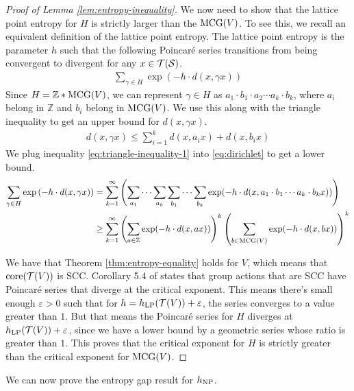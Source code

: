 \documentclass[12pt, reqno]{amsart}
\begin{document}
\begin{proof}[Proof of Lemma \ref{lem:entropy-inequality}]
  We now need to show that the lattice point entropy for $H$ is strictly larger than the $\mathrm{MCG}(V)$.
  To see this, we recall an equivalent definition of the lattice point entropy.
  The lattice point entropy is the parameter $h$ such that the following Poincaré series transitions from being convergent to divergent for any $x \in \mathcal{T}(\mathcal{S})$.
  \begin{align}
    \label{eq:dirichlet}
    \sum_{\gamma \in H} \exp\left( -h \cdot d(x, \gamma x) \right)
  \end{align}
  Since $H = \mathbb{Z} * \mathrm{MCG}(V)$, we can represent $\gamma \in H$ as $a_1 \cdot b_1 \cdot a_2 \cdots a_k \cdot b_k$, where $a_i$ belong in $\mathbb{Z}$ and $b_i$ belong in $\mathrm{MCG}(V)$.
  We use this along with the triangle inequality to get an upper bound for $d(x, \gamma x)$.
  \begin{align}
    \label{eq:triangle-inequality-1}
    d(x, \gamma x) \leq \sum_{i=1}^k d(x, a_i x) + d(x, b_i x)
  \end{align}
  We plug inequality \eqref{eq:triangle-inequality-1} into \eqref{eq:dirichlet} to get a lower bound.
  \begin{align}
    \label{eq:dirichlet-lower-bound}
    \sum_{\gamma \in H} \exp\left( -h \cdot d(x, \gamma x) \right) &= \sum_{k=1}^\infty \left(  \sum_{a_1}\cdots \sum_{a_k} \sum_{b_1}\cdots \sum_{b_k}  \exp(-h \cdot d(x, a_1 \cdot b_1 \cdots a_k \cdot b_k x)) \right) \\
    &\geq \sum_{k=1}^{\infty} \left( \sum_{a \in \mathbb{Z}} \exp(-h \cdot d(x, ax)) \right)^k \left( \sum_{b \in \mathrm{MCG}(V)} \exp(-h \cdot d(x, bx)) \right)^k
    \label{eq:dirichlet-lower-bound-2}
  \end{align}

  We have that Theorem \ref{thm:entropy-equality} holds for $V$, which means that $\mathrm{core}(\mathcal{T}(V))$ is SCC.
  Corollary 5.4 of \cite{10.1093/imrn/rny001} states that group actions that are SCC have Poincaré series that diverge at the critical exponent.
  This means there's small enough $\varepsilon > 0$ such that for $h = h_{\mathrm{LP}}(\mathcal{T}(V)) + \varepsilon$, the series converges to a value greater than $1$.
  But that means the Poincaré series for $H$ diverges at $h_{\mathrm{LP}}(\mathcal{T}(V)) + \varepsilon$, since we have a lower bound by a geometric series whose ratio is greater than $1$.
  This proves that the critical exponent for $H$ is strictly greater than the critical exponent for $\mathrm{MCG}(V)$.
\end{proof}

We can now prove the entropy gap result for $h_{\mathrm{NP}}$.
\end{document}
